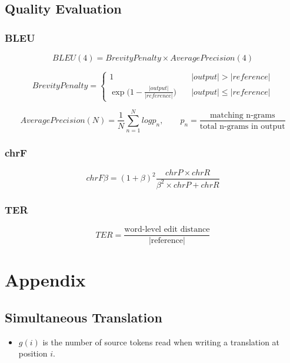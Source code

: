 \documentclass[landscape]{article}
\begin{document}
\subsection*{Quality Evaluation}
\vspace*{5mm}
\subsubsection*{BLEU}
\begin{equation}\nonumber
	BLEU(4) = BrevityPenalty \times AveragePrecision(4) 
\end{equation}

\begin{equation}\nonumber
	BrevityPenalty = \left\{
		 \begin{array}{ll}
		 	1 & \quad |output| > |reference|	\\
		 	\exp\bigg (1 - \frac{|output|}{|reference|}\bigg) & \quad |output| \leq |reference|
   		 \end{array}
    \right.	
\end{equation}

\begin{equation}\nonumber
	AveragePrecision(N) = \frac{1}{N} \sum_{n=1}^N log p_n, \qquad 	p_n = \frac{\mbox{matching n-grams}}{\mbox{total n-grams in output}}
\end{equation}

\subsubsection*{chrF}
 \begin{equation}\nonumber
 	chrF \beta = (1 + \beta)^2 \frac{chrP \times chrR}{\beta^2 \times chrP + chrR}
 \end{equation}
\subsubsection*{TER}
\begin{equation}\nonumber
	TER = \frac{\mbox{word-level edit distance}}{|\mbox{reference}|}
\end{equation}

\cp
\thispagestyle{empty}
\section*{Appendix}
\vspace*{10mm}
\subsection*{Simultaneous Translation}
\vspace*{5mm}
\begin{itemize}
	\item $g(i)$ is the number of source tokens read when writing a translation at position $i$.
\end{itemize}
\end{document}
